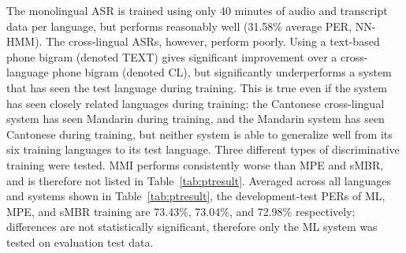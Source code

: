 The monolingual ASR is trained using only 40 minutes of audio and
transcript data per language, but performs reasonably well (31.58\%
average PER, NN-HMM).  The cross-lingual ASRs, however, perform poorly.
Using a text-based phone bigram (denoted {\sc TEXT}) gives significant
improvement over a cross-language phone bigram (denoted {\sc CL}),
but significantly underperforms a system that has seen the test
language during training.  This is true even if the system has seen
closely related languages during training: the Cantonese cross-lingual
system has seen Mandarin during training, and the Mandarin system has
seen Cantonese during training, but neither system is able to
generalize well from its six training languages to its test language.
{\color{blue} Three different types of discriminative training were
  tested.  MMI performs consistently worse than MPE and sMBR, and is
  therefore not listed in Table~\ref{tab:ptresult}.  Averaged across
  all languages and systems shown in Table~\ref{tab:ptresult}, the
  development-test PERs of ML, MPE, and sMBR training are 73.43\%,
  73.04\%, and 72.98\% respectively; differences are not statistically
  significant, therefore only the ML system was tested on evaluation
  test data.}


